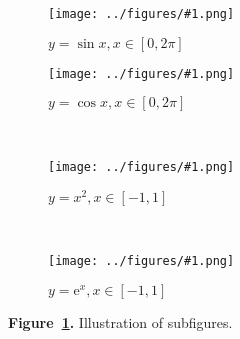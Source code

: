 \documentclass{article}
\def\includedemofigure#1#2{
    \begin{subfigure}{0.3\linewidth}
        \texttt{[image: ../figures/\#1.png]}
        \caption{#2}
    \end{subfigure}
}
\begin{document}
\thispagestyle{empty}
\begin{figure}
    \centering
    \includedemofigure{sin}{\(y=\sin x, x\in[0,2\pi]\)}
    \includedemofigure{cos}{\(y=\cos x, x\in[0,2\pi]\)}
    \\
    \includedemofigure{square}{\(y=x^2, x\in[-1,1]\)}\
    \includedemofigure{exp}{\(y=\mathrm{e}^x, x\in[-1,1]\)}
    \caption{\textbf{Figure~\ref{Figure-Subfigures}.} Illustration of subfigures.}\label{Figure-Subfigures}
\end{figure}
\end{document}
